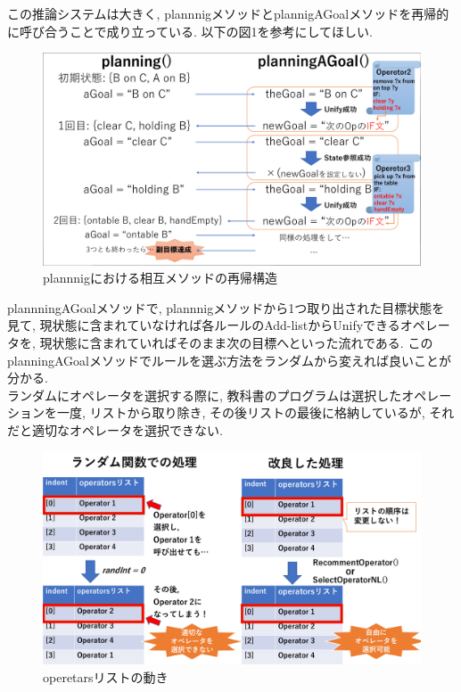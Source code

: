 \documentclass[uplatex,12pt]{jsarticle}
\begin{document}
この推論システムは大きく, plannnigメソッドとplannigAGoalメソッドを再帰的に呼び合うことで成り立っている.
以下の図1を参考にしてほしい.
\begin{figure}[htbp]
 \begin{center}
  \includegraphics[width = 12cm, pagebox = cropbox, clip]{images/planning.pdf}
 \end{center}
 \caption[]{plannnigにおける相互メソッドの再帰構造}\label{fig:fig1.1}
\end{figure}

plannningAGoalメソッドで, plannnigメソッドから1つ取り出された目標状態を見て, 現状態に含まれていなければ各ルールのAdd-listからUnifyできるオペレータを,  現状態に含まれていればそのまま次の目標へといった流れである. このplanningAGoalメソッドでルールを選ぶ方法をランダムから変えれば良いことが分かる.\\

ランダムにオペレータを選択する際に, 教科書のプログラムは選択したオペレーションを一度, リストから取り除き, その後リストの最後に格納しているが, それだと適切なオペレータを選択できない.

\begin{figure}[htbp]
 \begin{center}
  \includegraphics[width = 12cm, pagebox = cropbox, clip]{images/random.pdf}
 \end{center}
 \caption[]{operetarsリストの動き}\label{fig:fig1.1}
\end{figure}
\end{document}

